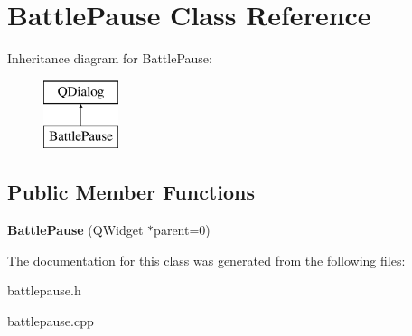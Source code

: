 \hypertarget{class_battle_pause}{\section{Battle\-Pause Class Reference}
\label{class_battle_pause}
}
Inheritance diagram for Battle\-Pause\-:\begin{figure}[H]
\begin{center}
\leavevmode
\includegraphics[height=2.000000cm]{class_battle_pause}
\end{center}
\end{figure}
\subsection*{Public Member Functions}
\begin{DoxyCompactItemize}
\item 
\hypertarget{class_battle_pause_a18df0a04e1e6ace26dd944ba5887d65c}{{\bfseries Battle\-Pause} (Q\-Widget $\ast$parent=0)}\label{class_battle_pause_a18df0a04e1e6ace26dd944ba5887d65c}

\end{DoxyCompactItemize}


The documentation for this class was generated from the following files\-:\begin{DoxyCompactItemize}
\item 
battlepause.\-h\item 
battlepause.\-cpp\end{DoxyCompactItemize}
